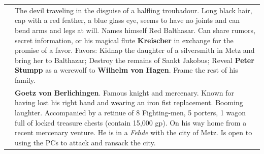 \documentclass[
]{book}
\begin{document}
\begin{longtable}[]{@{}
  >{\raggedright\arraybackslash}p{}
  >{\raggedright\arraybackslash}p{}@{}}
99 & The devil traveling in the disguise of a halfling troubadour. Long black hair, cap with a red feather, a blue glass eye, seems to have no joints and can bend arms and legs at will. Names himself Red Balthasar. Can share rumors, secret information, or his magical flute \textbf{Kreischer} in exchange for the promise of a favor. Favors: Kidnap the daughter of a silversmith in Metz and bring her to Balthazar; Destroy the remains of Sankt Jakobus; Reveal \textbf{Peter Stumpp} as a werewolf to \textbf{Wilhelm von Hagen}. Frame the rest of his family. \\
100 & \textbf{Goetz von Berlichingen}. Famous knight and mercenary. Known for having lost his right hand and wearing an iron fist replacement. Booming laughter. Accompanied by a retinue of 8 Fighting-men, 5 porters, 1 wagon full of locked treasure chests (contain 15,000 gp). On his way home from a recent mercenary venture. He is in a \emph{Fehde} with the city of Metz. Is open to using the PCs to attack and ransack the city. \\
\end{longtable}
\end{document}
